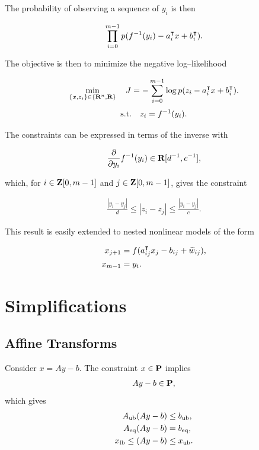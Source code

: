 \documentclass{article}
\begin{document}
    The probability of observing a sequence of $y_i$ is then

    \begin{align*}
        \prod_{i=0}^{m-1} p(f^{-1}(y_i) - a_i^\intercal x + b_i^\intercal).
    \end{align*}

    The objective is then to minimize the negative log--likelihood

    \begin{align*}
        \min_{\{x,z_i\}\in\{\textbf{R}^n,\textbf{R}\}}\quad J = -\sum_{i=0}^{m-1} \log p(z_i - a_i^\intercal x + b_i^\intercal).
    \end{align*}
    \begin{align*}
        \text{s.t.}\quad z_i=f^{-1}(y_i).
    \end{align*}

    The constraints can be expressed in terms of the inverse with

    \begin{align*}
        \frac{\partial }{\partial y_i}f^{-1}(y_i)\in\textbf{R}[d^{-1},c^{-1}],
    \end{align*}

    which, for $i\in\textbf{Z}[0,m-1]$ and $j\in\textbf{Z}[0,m-1]$, gives the constraint

    \begin{align*}
        \frac{|y_i-y_j|}{d}\leq |z_i-z_j| \leq \frac{|y_i-y_j|}{c}.
    \end{align*}

    This result is easily extended to nested nonlinear models of the form

    \begin{align*}
        x_{j+1} &= f(a_{ij}^\intercal x_{j}-b_{ij} + \widetilde{w}_{ij}),\\
        x_{m-1}&=y_i.
    \end{align*}



\clearpage

\section{Simplifications}

\subsection{Affine Transforms}

    Consider $x=Ay-b$.  The constraint $x\in\textbf{P}$ implies
    \begin{align*}
        Ay-b\in\textbf{P},
    \end{align*}
    which gives
    \begin{align*}
        A_{\text{ub}} (A&y-b)\leq b_{\text{ub}},\\
        A_{\text{eq}} (A&y-b) = b_{\text{eq}},\\
        x_{\text{lb}} \leq (A&y-b) \leq x_{\text{ub}}.
    \end{align*}
\end{document}
